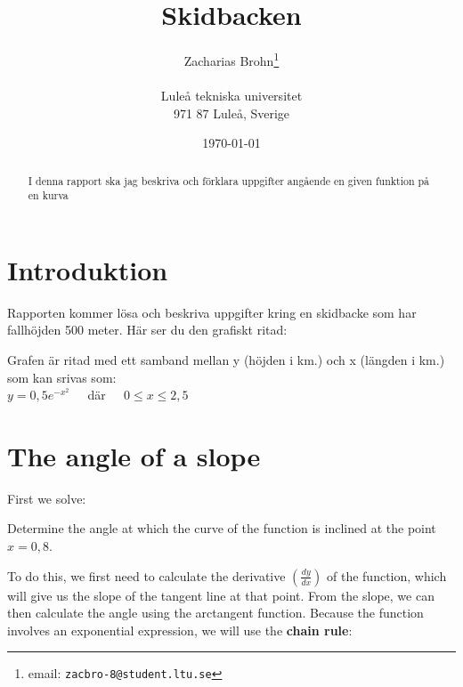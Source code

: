 \documentclass[a4paper,12pt]{article}
\title{Skidbacken}
\author{Zacharias Brohn\thanks{email:
        \texttt{zacbro-8@student.ltu.se}}\\  
        ~ \\
        Luleå tekniska universitet \\ 
        971 87 Luleå, Sverige}
\date{\today}
\begin{document}
\linenumbers %

\maketitle

\begin{abstract}
  I denna rapport ska jag beskriva och förklara uppgifter angående en given funktion på en kurva 
\end{abstract}
\section{Introduktion}
\label{sec:introduktion}
Rapporten kommer lösa och beskriva uppgifter kring en skidbacke som har fallhöjden 500 meter. Här ser du den grafiskt ritad:

\noindent
{}\newline
Grafen är ritad med ett samband mellan y (höjden i km.) och x (längden i km.) som kan srivas som:\\
$y = 0,5e^{-x^2}$ $\>$ $\>$ där $\>$ $\>$ $0 \leq x \leq 2,5$\\
\section{The angle of a slope}
\label{sec:uppg1}
  First we solve:\\
  \begin{addmargin}[1em]{1em}
    Determine the angle at which the curve of the function is inclined at the point $x=0,8$.\\
  \end{addmargin}
  To do this, we first need to calculate the derivative $\left(\frac{dy}{dx}\right)$ of the function, which will give us the slope of the tangent line at that point. From the slope, we can then calculate the angle using the arctangent function. Because the function involves an exponential expression, we will use the \textbf{chain rule}:
\end{document}
